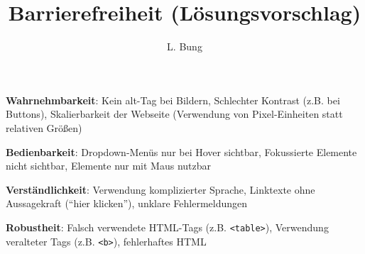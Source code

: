 \documentclass[11pt, a4paper]{article}
\begin{document}
	\author{L. Bung}
	\title{Barrierefreiheit \hspace{10cm}(Lösungsvorschlag)}
	\subject{SAE}
	\maketitle
	
	
	\textbf{Wahrnehmbarkeit}: Kein alt-Tag bei Bildern, Schlechter Kontrast (z.B. bei Buttons), Skalierbarkeit der Webseite (Verwendung von Pixel-Einheiten statt relativen Größen)
	
	\textbf{Bedienbarkeit}: Dropdown-Menüs nur bei Hover sichtbar, Fokussierte Elemente nicht sichtbar, Elemente nur mit Maus nutzbar
	
	\textbf{Verständlichkeit}: Verwendung komplizierter Sprache, Linktexte ohne Aussagekraft (``hier klicken''), unklare Fehlermeldungen
	
	\textbf{Robustheit}: Falsch verwendete HTML-Tags (z.B. \texttt{<table>}), Verwendung veralteter Tags (z.B. \texttt{<b>}), fehlerhaftes HTML
	
	
	

	
	
	
	
	
\end{document}
